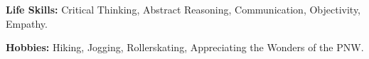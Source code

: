 \documentclass[margin]{res} %
\begin{document}
\begin{resume}
{\bf Life Skills:} Critical Thinking, Abstract Reasoning, Communication, Objectivity, Empathy.

{\bf Hobbies:} Hiking, Jogging, Rollerskating, Appreciating the Wonders of the PNW.



\end{resume}
\end{document}
